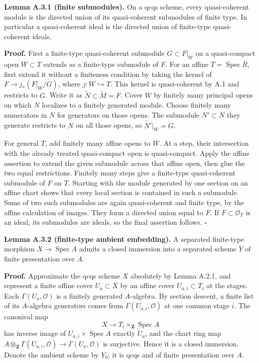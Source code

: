 \documentclass[11pt]{article}
\begin{document}
\textbf{Lemma A.3.1 (finite submodules).} On a qcqs scheme, every
quasi-coherent module is the directed union of its quasi-coherent
submodules of finite type. In particular a quasi-coherent ideal is the
directed union of finite-type quasi-coherent ideals.

\textbf{Proof.} First a finite-type quasi-coherent submodule
\(G\subset F|_W\) on a quasi-compact open \(W\subset T\) extends as a
finite-type submodule of \(F\). For an affine
\(T=\operatorname{Spec}R\), first extend it without a finiteness
condition by taking the kernel of \(F\to j_*(F|_W/G)\), where
\(j:W\hookrightarrow T\). This kernel is quasi-coherent by A.1 and
restricts to \(G\). Write it as \(\widetilde N\subset\widetilde M=F\).
Cover \(W\) by finitely many principal opens on which \(N\) localizes to
a finitely generated module. Choose finitely many numerators in \(N\)
for generators on those opens. The submodule \(N'\subset N\) they
generate restricts to \(N\) on all those opens, so
\(\widetilde{N'}|_W=G\).

For general \(T\), add finitely many affine opens to \(W\). At a step,
their intersection with the already treated quasi-compact open is
quasi-compact. Apply the affine assertion to extend the given submodule
across that affine open, then glue the two equal restrictions. Finitely
many steps give a finite-type quasi-coherent submodule of \(F\) on
\(T\). Starting with the module generated by one section on an affine
chart shows that every local section is contained in such a submodule.
Sums of two such submodules are again quasi-coherent and finite type, by
the affine calculation of images. They form a directed union equal to
\(F\). If \(F\subset\mathcal O_T\) is an ideal, its submodules are
ideals, so the final assertion follows. \(\square\)

\textbf{Lemma A.3.2 (finite-type ambient embedding).} A separated
finite-type morphism \(X\to\operatorname{Spec}A\) admits a closed
immersion into a separated scheme \(Y\) of finite presentation over
\(A\).

\textbf{Proof.} Approximate the qcqs scheme \(X\) absolutely by Lemma
A.2.1, and represent a finite affine cover \(U_a\subset X\) by an affine
cover \(U_{a,i}\subset T_i\) at the stages. Each
\(\Gamma(U_a,\mathcal O)\) is a finitely generated \(A\)-algebra. By
section descent, a finite list of its \(A\)-algebra generators comes
from \(\Gamma(U_{a,i},\mathcal O)\) at one common stage \(i\). The
canonical map \[
X\longrightarrow T_i\times_{\mathbf Z}\operatorname{Spec}A
\] has inverse image of \(U_{a,i}\times\operatorname{Spec}A\) exactly
\(U_a\), and the chart ring map
\(A\otimes_{\mathbf Z}\Gamma(U_{a,i},\mathcal O)\to\Gamma(U_a,\mathcal O)\)
is surjective. Hence it is a closed immersion. Denote the ambient scheme
by \(Y_0\); it is qcqs and of finite presentation over \(A\).
\end{document}
